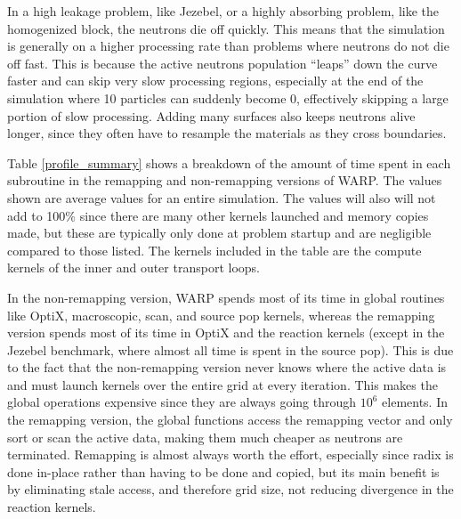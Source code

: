 In a high leakage problem, like Jezebel, or a highly absorbing problem, like the homogenized block, the neutrons die off quickly.  This means that the simulation is generally on a higher processing rate than problems where neutrons do not die off fast.  This is because the active neutrons population ``leaps'' down the curve faster and can skip very slow processing regions, especially at the end of the simulation where 10 particles can suddenly become 0, effectively skipping a large portion of slow processing.  Adding many surfaces also keeps neutrons alive longer, since they often have to resample the materials as they cross boundaries.  

Table \ref{profile_summary} shows a breakdown of the amount of time spent in each subroutine in the remapping and non-remapping versions of WARP.  The values shown are average values for an entire simulation.  The values will also will not add to 100\% since there are many other kernels launched and memory copies made, but these are typically only done at problem startup and are negligible compared to those listed.  The kernels included in the table are the compute kernels of the inner and outer transport loops.  

In the non-remapping version, WARP spends most of its time in global routines like OptiX, macroscopic, scan, and source pop kernels, whereas the remapping version spends most of its time in OptiX and the reaction kernels (except in the Jezebel benchmark, where almost all time is spent in the source pop).  This is due to the fact that the non-remapping version never knows where the active data is and must launch kernels over the entire grid at every iteration.  This makes the global operations expensive since they are always going through $10^6$ elements.  In the remapping version, the global functions access the remapping vector and only sort or scan the active data, making them much cheaper as neutrons are terminated.  Remapping is almost always worth the effort, especially since radix is done in-place rather than having to be done and copied, but its main benefit is by eliminating stale access, and therefore grid size, not reducing divergence in the reaction kernels.




